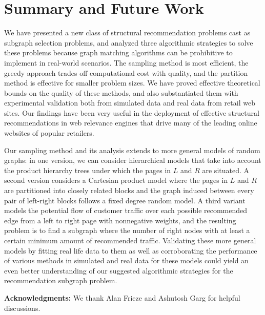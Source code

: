 \section{Summary and Future Work}
We have presented a new class of structural recommendation problems
cast as subgraph selection problems, and analyzed three algorithmic
strategies to solve these problems because graph matching algorithms can be
prohibitive to implement in real-world scenarios. The sampling method is most
efficient, the greedy approach trades off computational cost with
quality, and the partition method is effective for smaller problem
sizes. We have proved effective theoretical bounds on the quality
of these methods, and also substantiated them with experimental
validation both from simulated data and real data from
retail web sites. Our findings have been very useful in the
deployment of effective structural recommendations in web relevance
engines that drive many of the leading online websites of popular
retailers. \vs

Our sampling method and its analysis extends to more general
models of random graphs: in one version, we can consider
hierarchical models that take into account the product hierarchy
trees under which the pages in $L$ and $R$ are situated. A second
version considers a Cartesian product model where the pages in $L$
and $R$ are partitioned into closely related blocks and the graph
induced between every pair of left-right blocks follows a fixed
degree random model. A third variant models the potential flow of
customer traffic over each possible recommended edge from a left to
right page with nonnegative weights, and the resulting problem is
to find a subgraph where the number of right nodes with at least a
certain minimum amount of recommended traffic. Validating these
more general models by fitting real life data to them as well as
corroborating the performance of various methods in simulated and
real data for these models could yield an even better understanding
of our suggested algorithmic strategies for the 
recommendation subgraph problem.\vs

{\bf Acknowledgments:} We thank Alan Frieze and Ashutosh Garg for helpful
discussions.

\vspace{-.1in}